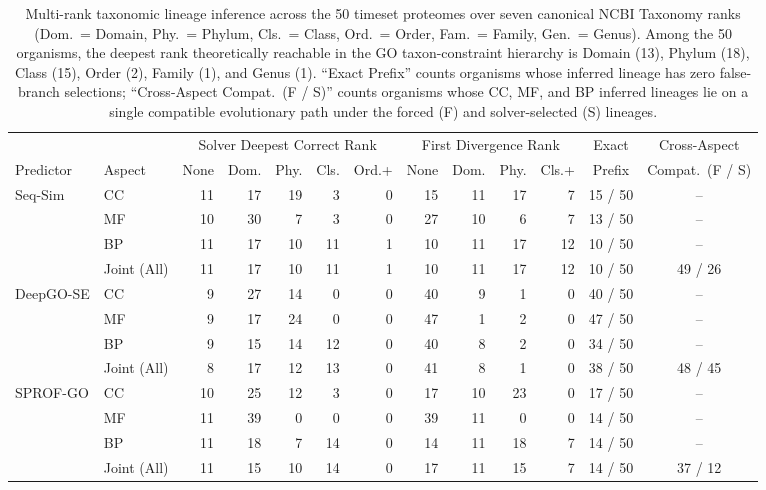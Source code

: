 \begin{table}[!h]
\centering
\caption{Multi-rank taxonomic lineage inference across the 50 timeset proteomes over seven canonical NCBI Taxonomy ranks (Dom.\ = Domain, Phy.\ = Phylum, Cls.\ = Class, Ord.\ = Order, Fam.\ = Family, Gen.\ = Genus). Among the 50 organisms, the deepest rank theoretically reachable in the GO taxon-constraint hierarchy is Domain (13), Phylum (18), Class (15), Order (2), Family (1), and Genus (1). ``Exact Prefix'' counts organisms whose inferred lineage has zero false-branch selections; ``Cross-Aspect Compat.\ (F / S)'' counts organisms whose CC, MF, and BP inferred lineages lie on a single compatible evolutionary path under the forced (F) and solver-selected (S) lineages.}
\label{tab:supp-lineage}
\scriptsize
\setlength{\tabcolsep}{2.5pt}
\renewcommand{\arraystretch}{0.94}
\begin{tabular}{ll rrrrr rrrr cc}
\toprule
 & & \multicolumn{5}{c}{Solver Deepest Correct Rank} & \multicolumn{4}{c}{First Divergence Rank} & Exact & Cross-Aspect \\
\cmidrule(lr){3-7}\cmidrule(lr){8-11}
Predictor & Aspect & None & Dom. & Phy. & Cls. & Ord.+ & None & Dom. & Phy. & Cls.+ & Prefix & Compat.\ (F / S) \\
\midrule
\multirow{4}{*}{Seq-Sim}
 & CC          & 11 & 17 & 19 &  3 & 0 & 15 & 11 & 17 &  7 & 15 / 50 & -- \\
 & MF          & 10 & 30 &  7 &  3 & 0 & 27 & 10 &  6 &  7 & 13 / 50 & -- \\
 & BP          & 11 & 17 & 10 & 11 & 1 & 10 & 11 & 17 & 12 & 10 / 50 & -- \\
 & Joint (All) & 11 & 17 & 10 & 11 & 1 & 10 & 11 & 17 & 12 & 10 / 50 & 49 / 26 \\
\midrule
\multirow{4}{*}{DeepGO-SE}
 & CC          &  9 & 27 & 14 &  0 & 0 & 40 &  9 &  1 &  0 & 40 / 50 & -- \\
 & MF          &  9 & 17 & 24 &  0 & 0 & 47 &  1 &  2 &  0 & 47 / 50 & -- \\
 & BP          &  9 & 15 & 14 & 12 & 0 & 40 &  8 &  2 &  0 & 34 / 50 & -- \\
 & Joint (All) &  8 & 17 & 12 & 13 & 0 & 41 &  8 &  1 &  0 & 38 / 50 & 48 / 45 \\
\midrule
\multirow{4}{*}{SPROF-GO}
 & CC          & 10 & 25 & 12 &  3 & 0 & 17 & 10 & 23 &  0 & 17 / 50 & -- \\
 & MF          & 11 & 39 &  0 &  0 & 0 & 39 & 11 &  0 &  0 & 14 / 50 & -- \\
 & BP          & 11 & 18 &  7 & 14 & 0 & 14 & 11 & 18 &  7 & 14 / 50 & -- \\
 & Joint (All) & 11 & 15 & 10 & 14 & 0 & 17 & 11 & 15 &  7 & 14 / 50 & 37 / 12 \\
\bottomrule
\end{tabular}
\end{table}
